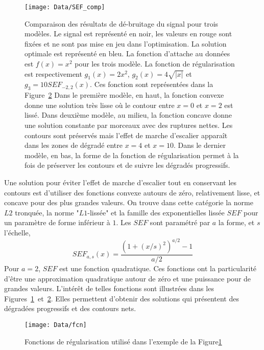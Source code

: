 \documentclass[../main/These_Mathias_Paget.tex]{subfiles}
\begin{document}
\begin{figure}
\centering
\texttt{[image: Data/SEF\_comp]}
\caption{Comparaison des résultats de dé-bruitage du signal  pour trois modèles. Le signal est représenté en noir, les valeurs en rouge sont fixées et ne sont pas mise en jeu dans l'optimisation. La solution optimale est représenté en bleu. La fonction d’attache au données est $f(x)=x^2$ pour les trois modèle. La fonction de régularisation est respectivement $g_1(x)=2x^2$, $g_2(x)=4\sqrt{|x|}$ et $g_3 = 10SEF_{-2,2}(x)$. Ces fonction sont représentées dans la Figure~\ref{fig:comp_opt_} Dans le première modèle, en haut, la fonction convexe donne une solution très lisse où le contour entre $x=0$ et $x=2$ est lissé. Dans deuxième modèle, au milieu, la fonction concave donne une solution constante par morceaux avec des ruptures nettes. Les contours sont préservés mais l'effet de marche d'escalier apparaît dans les zones de dégradé entre $x=4$ et $x=10$. Dans le dernier modèle, en bas, la forme de la fonction de régularisation permet à la fois de préserver les contours et de suivre les dégradés progressifs.}
\label{fig:comp_opt}
\end{figure}

Une solution pour éviter l'effet de marche d'escalier tout en conservant les contours est d'utiliser des fonctions convexe autours de zéro, relativement lisse, et concave pour des plus grandes valeurs. On trouve dans cette catégorie la norme $L2$ tronquée, la norme "$L1$-lissée" et la famille des exponentielles lissée $SEF$ pour un paramètre de forme inférieur à $1$. Les $SEF$ sont paramétré par $a$ la forme, et $s$ l’échelle,
\begin{equation}
SEF_{a,s}(x) =  \frac{ \left( 1+(x/s)^2 \right)^{a/2} - 1}{a/2}
\label{eq:def_SEF}
\end{equation}
Pour $a=2$, $SEF$ est une fonction quadratique. Ces fonctions ont la particularité d'être une approximation quadratique autour de zéro et une puissance pour de grandes valeurs. L'intérêt de telles fonctions sont illustrées dans les Figures~\ref{fig:comp_opt}~et~\ref{fig:comp_opt_}. Elles permettent d'obtenir des solutions qui présentent des dégradées progressifs et des contours nets.

\begin{figure}
\centering
\texttt{[image: Data/fcn]}
\caption{Fonctions de régularisation utilisé dans l'exemple de la Figure\ref{fig:comp_opt}}
\label{fig:comp_opt_}
\end{figure}
\end{document}
